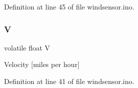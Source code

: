 Definition at line 45 of file windsensor.\+ino.

\mbox{\label{windsensor_8ino_aa4fd0d57d98c7d4f1072f2edd19ab2ed}} 
\subsubsection{\texorpdfstring{V}{V}}
{\footnotesize\ttfamily volatile float V\hspace{0.3cm}{\ttfamily [static]}}

Velocity \mbox{[}miles per hour\mbox{]} 

Definition at line 41 of file windsensor.\+ino.

